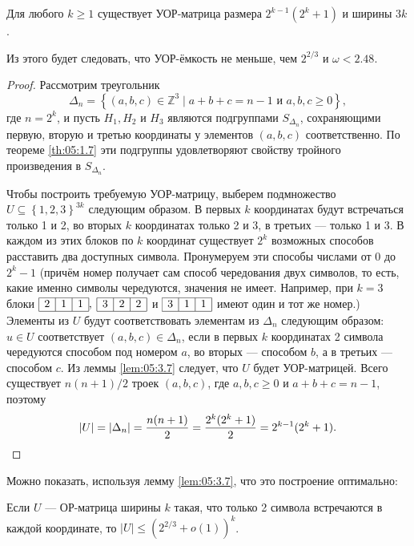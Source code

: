 \begin{prop}\label{prop:05:3.8}
  Для любого $k \geq 1$ существует УОР-матрица размера ${2^{k-1}(2^k + 1)}$ и ширины $3k$.
  
  Из этого будет следовать, что УОР-ёмкость не меньше, чем $2^{2/3}$ и $\omega < 2.48$.
\end{prop}
\begin{proof}
Рассмотрим треугольник
\[
	\Delta_n = \left\{ (a,b,c) \in \mathbb{Z}^3 \mid a+b+c=n-1 \text{ и } a,b,c \geq 0\right\},
\]
где $n=2^k$, и пусть $H_1, H_2$ и $H_3$ являются подгруппами $S_{\Delta_n}$, сохраняющими первую, вторую и третью координаты у элементов $(a,b,c)$ соответственно. По теореме \ref{th:05:1.7} эти подгруппы удовлетворяют свойству тройного произведения в $S_{\Delta_n}$.

Чтобы построить требуемую УОР-матрицу, выберем подмножество $U \subseteq \left\{ 1,2,3 \right\}^{3k}$ следующим образом. В первых $k$ координатах будут встречаться только 1 и 2, во вторых $k$ координатах только 2 и 3, в третьих --- только 1 и 3. В каждом из этих блоков по $k$ координат существует $2^k$ возможных способов расставить два доступных символа. Пронумеруем эти способы числами от 0 до $2^k-1$ (причём номер получает сам способ чередования двух символов, то есть, какие именно символы чередуются, значения не имеет. Например, при $k=3$ блоки $\begin{array}{|c|c|c|} \hline 2 & 1 & 1 \\ \hline\end{array}, \; \begin{array}{|c|c|c|} \hline 3 & 2 & 2 \\ \hline\end{array}$ и $\begin{array}{|c|c|c|} \hline 3 & 1 & 1 \\ \hline\end{array}$ имеют один и тот же номер.) Элементы из $U$ будут соответствовать элементам из $\Delta_n$ следующим образом: $u \in U$ соответствует $(a,b,c) \in \Delta_n$, если в первых $k$ координатах 2 символа чередуются способом под номером $a$, во вторых --- способом $b$, а в третьих --- способом $c$. Из леммы \ref{lem:05:3.7} следует, что $U$ будет УОР-матрицей. Всего существует $n(n+1)/2$ троек $(a,b,c)$, где $a,b,c \geq 0$ и $a + b + c = n-1$, поэтому  
\[
	|U|=|\Delta_n| = \frac{n(n+1)}{2} = \frac{2^k (2^k + 1)}{2} = 2^{k-1}(2^k + 1).\qedhere
\]
\end{proof}

Можно показать, используя лемму \ref{lem:05:3.7}, что это построение оптимально:
\begin{corollary}
  Если $U$ --- ОР-матрица ширины $k$ такая, что только 2 символа встречаются в каждой координате, то $|U| \leq (2^{2/3} + o(1))^k$.
\end{corollary}

